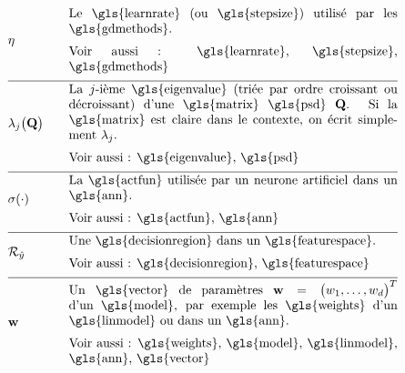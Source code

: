 \begin{align}
	& \lrate & \quad & \parbox{.75\textwidth}{
		Le \gls{learnrate} (ou \gls{stepsize}) utilisé par les \gls{gdmethods}. \\
		[2mm] Voir aussi : \gls{learnrate}, \gls{stepsize}, \gls{gdmethods}
	} \nonumber \\[2mm] \hline \nonumber\\[-5mm]
	& \eigval{\featureidx}\big( \mathbf{Q} \big) & \quad & \parbox{.75\textwidth}{
		La $\featureidx$-ième \gls{eigenvalue} (triée par ordre croissant ou décroissant) d’une \gls{matrix} \gls{psd} $\mathbf{Q}$. Si la \gls{matrix} est claire dans le contexte, on écrit simplement $\eigval{\featureidx}$. \\
		[2mm] Voir aussi : \gls{eigenvalue}, \gls{psd}
	} \nonumber \\[2mm] \hline \nonumber\\[-5mm]
	& \actfun(\cdot) & \quad & \parbox{.75\textwidth}{
		La \gls{actfun} utilisée par un neurone artificiel dans un \gls{ann}. \\
		[2mm] Voir aussi : \gls{actfun}, \gls{ann}
	} \nonumber \\[2mm] \hline \nonumber\\[-5mm]
	& \decreg{\hat{\truelabel}} & \quad & \parbox{.75\textwidth}{
		Une \gls{decisionregion} dans un \gls{featurespace}. \\
		[2mm] Voir aussi : \gls{decisionregion}, \gls{featurespace}
	} \nonumber \\[2mm] \hline \nonumber\\[-5mm]
	& \weights & \quad & \parbox{.75\textwidth}{
		Un \gls{vector} de paramètres $\weights = \big(\weight_{1},\ldots,\weight_{\featuredim}\big)^{T}$ d’un \gls{model}, par exemple les \gls{weights} d’un \gls{linmodel} ou dans un \gls{ann}. \\
		[2mm] Voir aussi : \gls{weights}, \gls{model}, \gls{linmodel}, \gls{ann}, \gls{vector}
	} \nonumber
\end{align}

